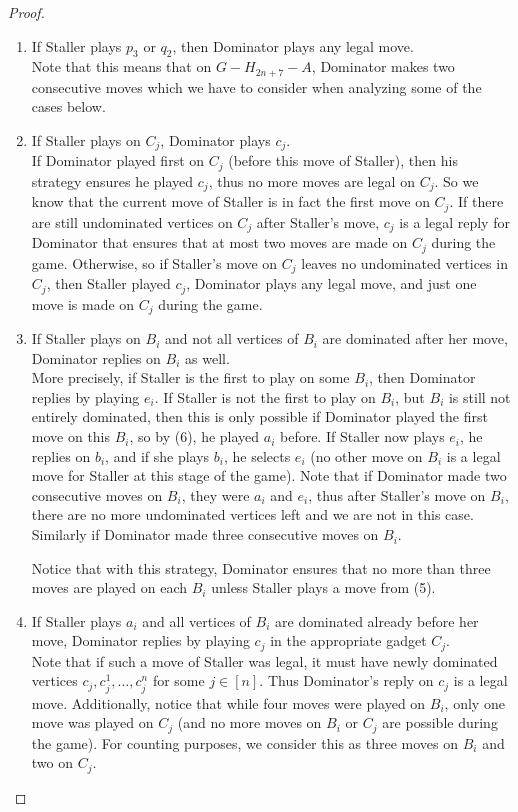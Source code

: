 \documentclass[10pt,a4paper]{amsart}
\begin{document}
\begin{proof}
\begin{enumerate}[(1)]
		\item If Staller plays $p_3$ or $q_2$, then Dominator plays any legal move.\\
		Note that this means that on $G - H_{2n+7} -A$, Dominator makes two consecutive moves which we have to consider when analyzing some of the cases below.
		
		\item If Staller plays on $C_j$, Dominator plays $c_j$.\\
		If Dominator played first on $C_j$ (before this move of Staller), then his strategy ensures he played $c_j$, thus no more moves are legal on $C_j$. So we know that the current move of Staller is in fact the first move on $C_j$. If there are still undominated vertices on $C_j$ after Staller's move, $c_j$ is a legal reply for Dominator that ensures that at most two moves are made on $C_j$ during the game. Otherwise, so if Staller's move on $C_j$ leaves no undominated vertices in $C_j$, then Staller played $c_j$, Dominator plays any legal move, and just one move is made on $C_j$ during the game.
		
		\item If Staller plays on $B_i$ and not all vertices of $B_i$ are dominated after her move, Dominator replies on $B_i$ as well.\\
		More precisely, if Staller is the first to play on some $B_i$, then Dominator replies by playing $e_i$. If Staller is not the first to play on $B_i$, but $B_i$ is still not entirely dominated, then this is only possible if Dominator played the first move on this $B_i$, so by (6), he played $a_i$ before. If Staller now plays $e_i$, he replies on $b_i$, and if she plays $b_i$, he selects $e_i$ (no other move on $B_i$ is a legal move for Staller at this stage of the game). Note that if Dominator made two consecutive moves on $B_i$, they were $a_i$ and $e_i$, thus after Staller's move on $B_i$, there are no more undominated vertices left and we are not in this case. Similarly if Dominator made three consecutive moves on $B_i$.
		
		Notice that with this strategy, Dominator ensures that no more than three moves are played on each $B_i$ unless Staller plays a move from (5).
		
		\item If Staller plays $a_i$ and all vertices of $B_i$ are dominated already before her move, Dominator replies by playing $c_j$ in the appropriate gadget $C_j$.\\
		Note that if such a move of Staller was legal, it must have newly dominated vertices $c_j, c_j^1, \ldots, c_j^n$ for some $j \in [n]$. Thus Dominator's reply on $c_j$ is a legal move. Additionally, notice that while four moves were played on $B_i$, only one move was played on $C_j$ (and no more moves on $B_i$ or $C_j$ are possible during the game). For counting purposes, we consider this as three moves on $B_i$ and two on $C_j$.
		

\end{enumerate}
\end{proof}
\end{document}
